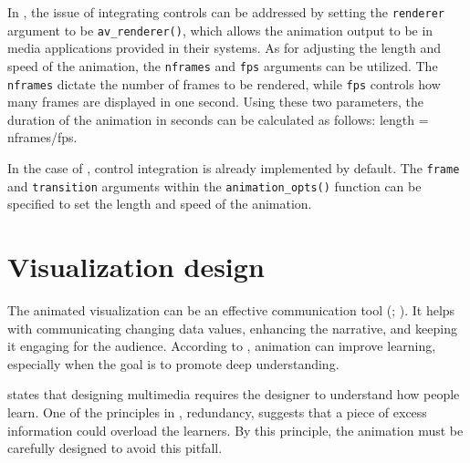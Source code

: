 In , the issue of integrating controls can be addressed by setting the \texttt{renderer} argument to be \texttt{av\_renderer()}, which allows the animation output to be in media applications provided in their systems. As for adjusting the length and speed of the animation, the \texttt{nframes} and \texttt{fps} arguments can be utilized. The \texttt{nframes} dictate the number of frames to be rendered, while \texttt{fps} controls how many frames are displayed in one second. Using these two parameters, the duration of the animation in seconds can be calculated as follows: length = nframes/fps.

In the case of , control integration is already implemented by default. The \texttt{frame} and \texttt{transition} arguments within the \texttt{animation\_opts()} function can be specified to set the length and speed of the animation.

\section{Visualization design}\label{design}

The animated visualization can be an effective communication tool (\citet{Mayer_Moreno_2002}; \citet{effective-trend}). It helps with communicating changing data values, enhancing the narrative, and keeping it engaging for the audience. According to \citet{Mayer_Moreno_2002}, animation can improve learning, especially when the goal is to promote deep understanding.

\citet{mayer_2005} states that designing multimedia requires the designer to understand how people learn. One of the principles in \citet{mayer_2005}, redundancy, suggests that a piece of excess information could overload the learners. By this principle, the animation must be carefully designed to avoid this pitfall.

